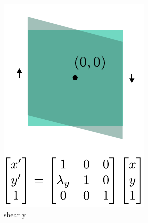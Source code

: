 \begin{figure}[t]
\begin{subfigure}[t]{0.195\linewidth}
        \includegraphics[width=\linewidth]{imgs/shear_y_affine.pdf}
        \caption{\label{fig:shear_y_affine} shear y}
    \end{subfigure}
    \begin{subfigure}[t]{0.195\linewidth}
        \centering

\end{subfigure}
\end{figure}
